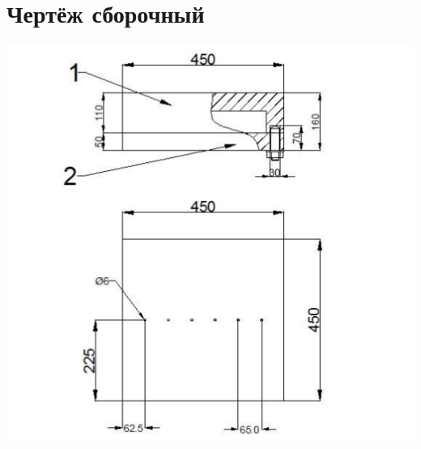 \chapter{Чертёж сборочный}
	\begin{center}
		\includegraphics[width=150mm]{src/pictures/drawingp3.png}
	\end{center}
